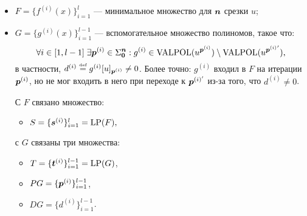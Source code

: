 \documentclass[14pt]{extarticle}
\begin{document}
\begin{itemize}
   \item$F=\{f^{(i)}(x)\}_{i=1}^l$ — минимальное множество для $\boldsymbol{n}$\nbdash
   срезки $u$;
   \item$G=\{g^{(i)}(x)\}_{i=1}^{l-1}$ — вспомогательное множество
   полиномов, такое что:
   $$\forall i\in [1,l-1]\; \exists \boldsymbol{p}^{(i)} \in \Sigma_{\boldsymbol{0}}^{\boldsymbol{n}}:
   g^{(i)}\in\operatorname{VALPOL}(u^{\boldsymbol{p}^{(i)}})\setminus\operatorname{VALPOL}(u^{{\boldsymbol{p}^{(i)}}'}),$$
   в частности,  $d^{(i)}\stackrel{\text{\tiny def}}{=} g^{(i)}[u]_{\boldsymbol{p}^{(i)}}\neq0$. Более точно:
   $g^{(i)}$ входил в $F$ на итерации $\boldsymbol{p}^{(i)}$, но не мог входить в него
   при переходе к $\boldsymbol{p}^{(i)'}$ из-за того, что $d^{(i)}\neq0$.

   С $F$ связано множество:
   \begin{itemize}
      \item$S=\{\boldsymbol{s}^{(i)}\}_{i=1}^l=\operatorname{LP}(F),$
   \end{itemize}
   с $G$ связаны три множества:
   \begin{itemize}\item$T=\{\boldsymbol{t}^{(i)}\}_{i=1}^{l-1} = \operatorname{LP}(G)$,
      \item$PG=\{\boldsymbol{p}^{(i)}\}_{i=1}^{l-1}$,
      \item$DG=\{d^{(i)}\}_{i=1}^{l-1}$.
   \end{itemize}
\end{itemize}
\end{document}
